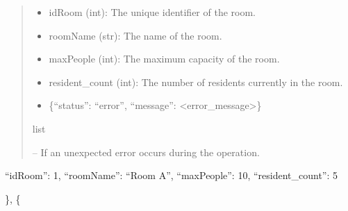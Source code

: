 \documentclass[letterpaper,10pt,english]{sphinxmanual}
\begin{document}
\begin{fulllineitems}
\begin{fulllineitems}
\begin{quote}
\begin{description}
\sphinxAtStartPar
\begin{description}
\begin{description}
\begin{itemize}
\item {} 
\sphinxAtStartPar
idRoom (int): The unique identifier of the room.

\item {} 
\sphinxAtStartPar
roomName (str): The name of the room.

\item {} 
\sphinxAtStartPar
maxPeople (int): The maximum capacity of the room.

\item {} 
\sphinxAtStartPar
resident\_count (int): The number of residents currently in the room.

\end{itemize}

\end{description}

\begin{itemize}
\item {} 
\sphinxAtStartPar
\{“status”: “error”, “message”: <error\_message>\}

\end{itemize}

\end{description}


\sphinxAtStartPar
list

\sphinxAtStartPar
{} – If an unexpected error occurs during the operation.

\end{description}\end{quote}
\begin{description}
\begin{description}
\sphinxlineitem{{[}}\begin{description}
\sphinxlineitem{\{}
\sphinxAtStartPar
“idRoom”: 1,
“roomName”: “Room A”,
“maxPeople”: 10,
“resident\_count”: 5

\end{description}

\sphinxAtStartPar
\},
\{
\begin{quote}


\end{quote}
\end{description}
\end{description}
\end{fulllineitems}
\end{fulllineitems}
\end{document}
